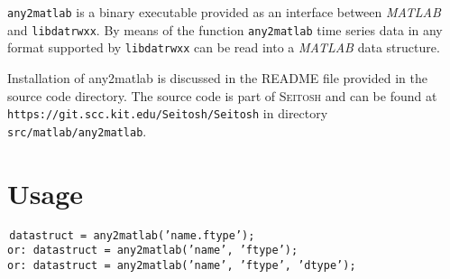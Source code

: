 \documentclass[10pt, a4paper, titlepage=false]{scrartcl}
\newcommand{\version}{2016-06-20}
\begin{document}
\title{} 
\author{\large{Daniel Armbruster - dani.armbruster@gmx.de}}
\date{\large{\version}}
\maketitle

\texttt{any2matlab} is a binary executable provided as an interface between
\emph{MATLAB} and \texttt{libdatrwxx}.
By means of the function \texttt{any2matlab} time series data in any format
supported by \texttt{libdatrwxx} can be read into a \emph{MATLAB} data
structure.

Installation of any2matlab is discussed in the README file provided in the
source code directory.
The source code is part of \textsc{Seitosh} and can be found at
\texttt{https://git.scc.kit.edu/Seitosh/Seitosh} in directory
\texttt{src/matlab/any2matlab}.

\section{Usage}
\texttt{$\,$\qquad datastruct = any2matlab('name.ftype');\\
        or: datastruct = any2matlab('name', 'ftype');\\
        or: datastruct = any2matlab('name', 'ftype', 'dtype');}
\end{document}
